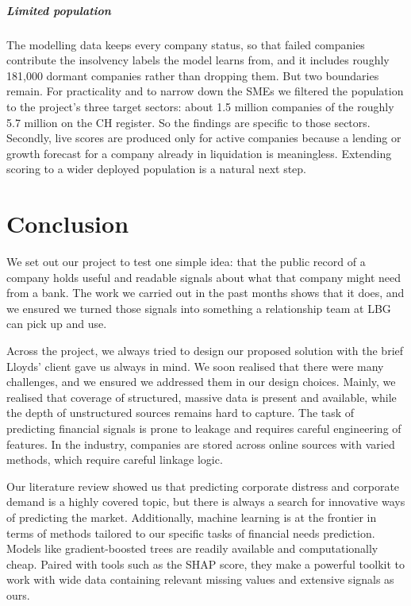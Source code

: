 \documentclass[    author={Samuel Menon Demelo; Sneha Saphala Ram Prasad; 
Viktor Ander Lindholm; Vishal Khatri},
               supervisor={Prof. Fernando Moreno-Pino},
                   degree={MSc},
                    title={Lloyds Commercial Banking Intelligence},
                 subtitle={Ranking SME Lending, Risk and Growth Prospects for Lloyds Banking Group},
                     type={},
                     year={2026}]{dissertation}
\begin{document}
\paragraph{Limited population}
The modelling data keeps every company status, so that failed companies contribute the insolvency labels the model learns from, and it includes roughly 181,000 dormant companies rather than dropping them. But two boundaries remain. For practicality and to narrow down the SMEs we filtered the population to the project's three target sectors: about 1.5 million companies of the roughly 5.7 million on the CH register\cite{beis_bpe}. So the findings are specific to those sectors. Secondly, live scores are produced only for active companies because a lending or growth forecast for a company already in liquidation is meaningless. Extending scoring to a wider deployed population is a natural next step.

\chapter{Conclusion}
\label{chap:conclusion}
We set out our project to test one simple idea: that the public record of a company holds useful and readable signals about what that company might need from a bank. The work we carried out in the past months shows that it does, and we ensured we turned those signals into something a relationship team at LBG can pick up and use.

Across the project, we always tried to design our proposed solution with the brief Lloyds' client gave us always in mind. We soon realised that there were many challenges, and we ensured we addressed them in our design choices. Mainly, we realised that coverage of structured, massive data is present and available, while the depth of unstructured sources remains hard to capture. The task of predicting financial signals is prone to leakage and requires careful engineering of features. In the industry, companies are stored across online sources with varied methods, which require careful linkage logic.

Our literature review showed us that predicting corporate distress and corporate demand is a highly covered topic, but there is always a search for innovative ways of predicting the market. Additionally, machine learning is at the frontier in terms of methods tailored to our specific tasks of financial needs prediction. Models like gradient-boosted trees are readily available and computationally cheap. Paired with tools such as the SHAP score, they make a powerful toolkit to work with wide data containing relevant missing values and extensive signals as ours.
\end{document}
